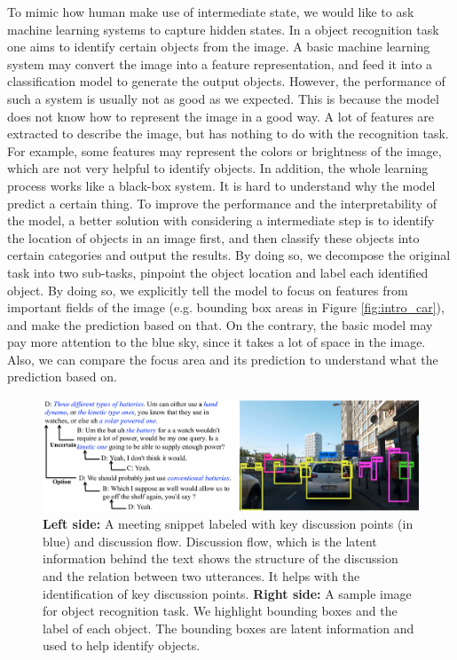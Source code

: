 To mimic how human make use of intermediate state, we would like to ask machine learning systems to capture hidden states. In a object recognition task one aims to identify certain objects from the image. A basic machine learning system may convert the image into a feature representation, and feed it into a classification model to generate the output objects. However, the performance of such a system is usually not as good as we expected. This is because the model does not know how to represent the image in a good way. A lot of features are extracted to describe the image, but has nothing to do with the recognition task. For example, some features may represent the colors or brightness of the image, which are not very helpful to identify objects. In addition, the whole learning process works like a black-box system. It is hard to understand why the model predict a certain thing. To improve the performance and the interpretability of the model, a better solution with considering a intermediate step is to identify the location of objects in an image first, and then classify these objects into certain categories and output the results. By doing so, we decompose the original task into two sub-tasks, pinpoint the object location and label each identified object. By doing so, we explicitly tell the model to focus on features from important fields of the image (e.g. bounding box areas in Figure \ref{fig:intro_car}), and make the prediction based on that. On the contrary, the basic model may pay more attention to the blue sky, since it takes a lot of space in the image. Also, we can compare the focus area and its prediction to understand what the prediction based on.

\begin{figure}[t] 
\centering
\includegraphics[width=1.0\columnwidth]{Images/intro_txt_car2.png} 
  \caption{\textbf{Left side:} A meeting snippet labeled with key discussion points (in blue) and discussion flow. Discussion flow, which is the latent information behind the text shows the structure of the discussion and the relation between two utterances. It helps with the identification of key discussion points. \textbf{Right side:} A sample image for object recognition task. We highlight bounding boxes and the label of each object. The bounding boxes are latent information and used to help identify objects.}
\end{figure}\label{fig:intro_car} 


